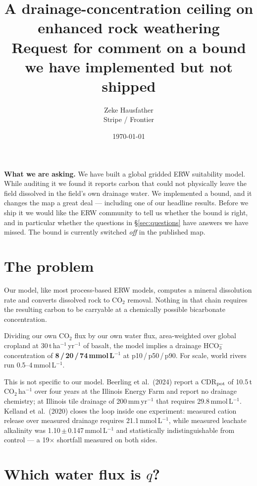 \documentclass[11pt,a4paper]{article}
\title{\vspace{-1.5cm}A drainage-concentration ceiling on enhanced rock weathering\\
\large Request for comment on a bound we have implemented but not shipped}
\author{Zeke Hausfather\\\small Stripe / Frontier}
\date{\today}
\newcommand{\hco}{HCO$_3^-$}
\newcommand{\cotwo}{CO$_2$}
\begin{document}
\maketitle
\vspace{-0.7cm}

\begin{tcolorbox}[colback=Gainsboro!25,colframe=Gray,boxrule=0.4pt,arc=2pt]
\textbf{What we are asking.} We have built a global gridded ERW suitability model.
While auditing it we found it reports carbon that could not physically leave the
field dissolved in the field's own drainage water. We implemented a bound, and it
changes the map a great deal --- including one of our headline results. Before we
ship it we would like the ERW community to tell us whether the bound is right, and
in particular whether the questions in \S\ref{sec:questions} have answers we
have missed. The bound is currently switched \emph{off} in the published map.
\end{tcolorbox}

\section{The problem}

Our model, like most process-based ERW models, computes a mineral dissolution rate
and converts dissolved rock to \cotwo{} removal. Nothing in that chain requires the
resulting carbon to be carryable at a chemically possible bicarbonate concentration.

Dividing our own \cotwo{} flux by our own water flux, area-weighted over global
cropland at 30\,t\,ha$^{-1}$\,yr$^{-1}$ of basalt, the
model implies a drainage \hco{} concentration of
\textbf{8\,/\,20\,/\,74\,mmol\,L$^{-1}$} at p10\,/\,p50\,/\,p90.
For scale, world rivers run 0.5--4\,mmol\,L$^{-1}$.

This is not specific to our model. Beerling et al.\ (2024) report a CDR$_{\rm pot}$
of 10.5\,t\,\cotwo{}\,ha$^{-1}$ over four years at the Illinois Energy Farm and
report no drainage chemistry; at Illinois tile drainage of 200\,mm\,yr$^{-1}$ that
requires 29.8\,mmol\,L$^{-1}$. Kelland et al.\ (2020) closes the loop inside one
experiment: measured cation release over measured drainage requires
21.1\,mmol\,L$^{-1}$, while measured leachate alkalinity was
1.10\,$\pm$\,0.147\,mmol\,L$^{-1}$ and statistically indistinguishable from control
--- a 19$\times$ shortfall measured on both sides.

\section{Which water flux is $q$?}
\label{sec:drainage}
\end{document}
